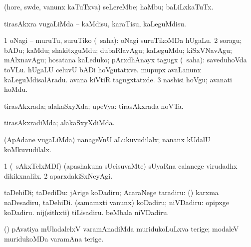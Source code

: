 \bentry
{} 
\gl{\nA}
\bmng
(hore, swde, \mo vanunx kaTuTxva) seLereMbe; haMbu; baLiLxkaTuTx. 
\emng
\eentry

\bentry
{} 
\gl{\sakirx}
\expl{}
\bmng
tirasAkxra \mo vugaLiMda -- kaMdisu, karaTisu, kaLeguMdisu. 
\emng

\noindent
\gl{\akirx}
\expl{}
\bmng
\bnum
\num{1} oNagi -- muruTu, suruTiko (\sakirx\ saha):  oNagi suruTikoMDa hUgaLu. 
\num{2} soragu; bADu; kaMdu; shakitxguMdu; dubaRlavAgu; kaLeguMdu; kiSxVNavAgu; mAlxnavAgu; hosatana kaLeduko; pArxdhAnayx tagugx (\sakirx\ saha):  saveduhoVda toVLu.  hUgaLU celuvU bADi hoVgutatxve.  mupupx avaLanunx kaLeguMdisalAradu.  avana kiVtiR tagugxtatxde. 
\num{3} nashisi hoVgu; avanati hoMdu. 
\enum
\emng
\eentry

\bentry
{} 
\gl{\gu}
\expl{}
\bmng
tirasAkxrada; alakaSxyXda; upeVya:  tirasAkxrada noVTa. 
\emng
\eentry

\bentry
{} 
\gl{\kirxvi}
\expl{}
\bmng
tirasAkxradiMda; alakaSxyXdiMda. 
\emng
\eentry

\bentry
{} 
\gl{\nA}
\emng

\noindent
\gl{\pagu}
\expl{}
\bmng
{} (ApAdane \mo vugaLiMda) nanageVnU aLukuvudilalx; nananx kUdalU koMkuvudilalx. 
\emng
\eentry

\bentry
{} 
\gl{\kirxvi}
\expl{}
\bmng
\bnum
\num{1} (\kanmu\ sAkxTelxMDf) (apashakuna sUcisuvaMte) sUyaRna calanege virudadhx dikikxnalilx. 
\num{2} aparxdakiSxNeyAgi. 
\enum
\emng
\eentry

\bentry
{} 
\gl{\sakirx}
\bmng
taDehiDi; taDediDu: 
\banum
{} jArige koDadiru; AcaraNege taradiru:  (\pArxparx) karxma naDesadiru, taDehiDi. 
 (samamxti \mo vanunx) koDadiru; niVDadiru:  opipxge koDadiru.  nij(sithxti) tiLisadiru.  beMbala niVDadiru. 
\eanum
\emng

\noindent
\gl{\pagu}
\expl{}
\bmng
{} (\ame) pAvatiya mUladalelxV varamAnadiMda muridukoLuLxva terige; modaleV muridukoMDa varamAna terige. 
\emng
\eentry

